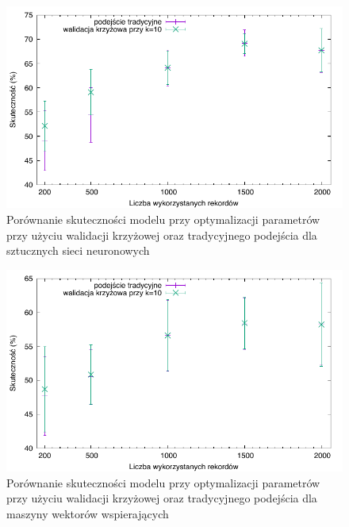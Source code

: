 \newcommand{\cvsize}{1}


\begin{figure}
\centering
\includegraphics[scale=\cvsize]{res/cv_ann.pdf}
\caption[Caption for LOF]{Porównanie skuteczności modelu przy optymalizacji parametrów przy użyciu walidacji krzyżowej oraz tradycyjnego podejścia dla sztucznych sieci neuronowych\label{cv_ann}}
\end{figure}

\begin{figure}
\centering
\includegraphics[scale=\cvsize]{res/cv_svm.pdf}
\caption[Caption for LOF]{Porównanie skuteczności modelu przy optymalizacji parametrów przy użyciu walidacji krzyżowej oraz tradycyjnego podejścia dla maszyny wektorów wspierających\label{cv_svm}}
\end{figure}

